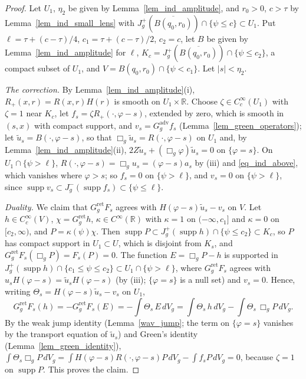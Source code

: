 \documentclass[11pt,a4paper,reqno]{amsart}
\theoremstyle{definition}
\numberwithin{equation}{section}
\newcommand{\R}{\mathbb{R}}
\newcommand{\supp}{\operatorname{supp}}
\newcommand{\ret}{\mathrm{ret}}
\newcommand{\adv}{\mathrm{adv}}
\begin{document}
\begin{proof}
Let $U_1$, $\eta_2$ be given by Lemma~\ref{lem_ind_amplitude}, and $r_0>0$, $c>\tau$ by Lemma~\ref{lem_ind_small_lens}
with $J^+_g(\overline{B(q_0,r_0)})\cap\{\psi\le c\}\subset U_1$. Put $\ell=\tau+(c-\tau)/4$, $c_1=\tau+(c-\tau)/2$,
$c_2=c$, let $B$ be given by Lemma~\ref{lem_ind_amplitude} for $\ell$, $K_c=J^+_g(\overline{B(q_0,r_0)})\cap\{\psi\le c_2\}$,
a compact subset of $U_1$, and $V=B(q_0,r_0)\cap\{\psi<c_1\}$. Let $|s|<\eta_2$.

\emph{The correction.} By Lemma~\ref{lem_ind_amplitude}(i), $R_+(x,r)=R(x,r)H(r)$ is smooth on $U_1\times\R$. Choose
$\zeta\in C_c^\infty(U_1)$ with $\zeta=1$ near $K_c$, let $f_s=\zeta R_+(\cdot,\varphi-s)$, extended by zero, which is
smooth in $(s,x)$ with compact support, and $v_s=G^\adv_gf_s$ (Lemma~\ref{lem_green_operators}); let
$\tilde u_s=B(\cdot,\varphi-s)$, so that $\Box_g\tilde u_s=R(\cdot,\varphi-s)$ on $U_1$ and, by
Lemma~\ref{lem_ind_amplitude}(ii), $2Z\tilde u_s+(\Box_g\varphi)\tilde u_s=0$ on $\{\varphi=s\}$. On
$U_1\cap\{\psi>\ell\}$, $R(\cdot,\varphi-s)=\Box_gu_s=(\varphi-s)a_s$ by (iii) and \eqref{eq_ind_above}, which vanishes
where $\varphi>s$; so $f_s=0$ on $\{\psi>\ell\}$, and $v_s=0$ on $\{\psi>\ell\}$, since
$\supp v_s\subset J^-_g(\supp f_s)\subset\{\psi\le\ell\}$.

\emph{Duality.} We claim that $G^\ret_gF_s$ agrees with $H(\varphi-s)\tilde u_s-v_s$ on $V$. Let $h\in C_c^\infty(V)$,
$\chi=G^\ret_gh$, $\kappa\in C^\infty(\R)$ with $\kappa=1$ on $(-\infty,c_1]$ and $\kappa=0$ on $[c_2,\infty)$, and
$P=\kappa(\psi)\chi$. Then $\supp P\subset J^+_g(\supp h)\cap\{\psi\le c_2\}\subset K_c$, so $P$ has compact support in
$U_1\subset U$, which is disjoint from $K_s$, and $G^\ret_gF_s(\Box_gP)=F_s(P)=0$. The function $E=\Box_gP-h$ is supported
in $J^+_g(\supp h)\cap\{c_1\le\psi\le c_2\}\subset U_1\cap\{\psi>\ell\}$, where $G^\ret_gF_s$ agrees with
$u_sH(\varphi-s)=\tilde u_sH(\varphi-s)$ (by (iii); $\{\varphi=s\}$ is a null set) and $v_s=0$. Hence, writing
$\Theta_s=H(\varphi-s)\tilde u_s-v_s$ on $U_1$,
\[
G^\ret_gF_s(h)=-G^\ret_gF_s(E)=-\int\Theta_s\,E\,dV_g=\int\Theta_s\,h\,dV_g-\int\Theta_s\,\Box_gP\,dV_g .
\]
By the weak jump identity (Lemma~\ref{wav_jump}; the term on $\{\varphi=s\}$ vanishes by the transport equation of
$\tilde u_s$) and Green's identity (Lemma~\ref{lem_green_identity}),
$\int\Theta_s\Box_gP\,dV_g=\int H(\varphi-s)R(\cdot,\varphi-s)P\,dV_g-\int f_sP\,dV_g=0$, because $\zeta=1$ on $\supp P$.
This proves the claim.


\end{proof}
\end{document}
